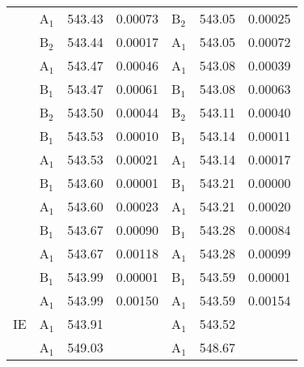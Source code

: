 \documentclass[journal=jctcce,manuscript=article]{achemso}
\begin{document}
\begin{table}
\begin{tabular}{l|lcc|lcc}
& A$_1$ & 543.43 & 0.00073      & B$_2$ & 543.05 & 0.00025 \\
& B$_2$ & 543.44 & 0.00017      & A$_1$ & 543.05 & 0.00072 \\
& A$_1$ & 543.47 & 0.00046      & A$_1$ & 543.08 & 0.00039 \\
& B$_1$ & 543.47 & 0.00061      & B$_1$ & 543.08 & 0.00063 \\
& B$_2$ & 543.50 & 0.00044      & B$_2$ & 543.11 & 0.00040 \\
& B$_1$ & 543.53 & 0.00010      & B$_1$ & 543.14 & 0.00011 \\
& A$_1$ & 543.53 & 0.00021      & A$_1$ & 543.14 & 0.00017 \\
& B$_1$ & 543.60 & 0.00001      & B$_1$ & 543.21 & 0.00000 \\
& A$_1$ & 543.60 & 0.00023      & A$_1$ & 543.21 & 0.00020 \\
& B$_1$ & 543.67 & 0.00090      & B$_1$ & 543.28 & 0.00084 \\
& A$_1$ & 543.67 & 0.00118      & A$_1$ & 543.28 & 0.00099 \\
& B$_1$ & 543.99 & 0.00001      & B$_1$ & 543.59 & 0.00001 \\
& A$_1$ & 543.99 & 0.00150      & A$_1$ & 543.59 & 0.00154 \\
 \hline
IE & A$_1$ & 543.91 &       & A$_1$ & 543.52  & \\   
   & A$_1$ & 549.03 &       & A$_1$ & 548.67 &  \\
\hline
  \end{tabular}
\end{table}
\end{document}
